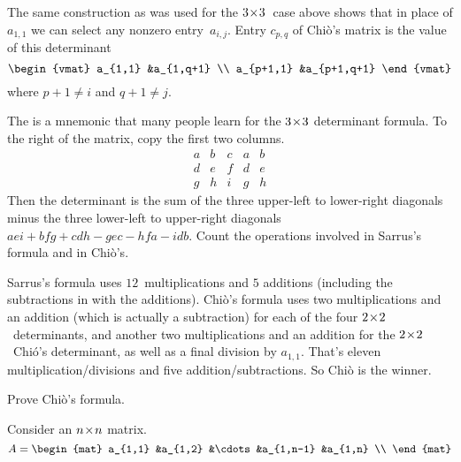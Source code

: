 \begin{exercises}
    \begin{answer}
      The same construction as was used for the $3 \! \times \! 3$~case above shows
      that in place of $a_{1,1}$ we can select any nonzero entry~$a_{i,j}$.
      Entry $c_{p,q}$ of Chi\`o's matrix is the value of this determinant
      \begin{equation*}
        \begin{vmat}
          a_{1,1}    &a_{1,q+1} \\
          a_{p+1,1}  &a_{p+1,q+1}
        \end{vmat}
      \end{equation*}
      where $p+1\neq i$ and $q+1\neq j$.
    \end{answer}
  \item The 
    is a mnemonic that many people learn 
    for the $3 \! \times \! 3$ determinant formula.
    To the right of the matrix, copy the first two columns. 
    \begin{equation*}
      \begin{array}{ccc|cc}
        a &b &c &a &b \\
        d &e &f &d &e \\
        g &h &i &g &h
      \end{array}
    \end{equation*}
    Then the determinant is the sum of the
    three upper-left to lower-right diagonals minus the
    three lower-left to upper-right diagonals
    $aei+bfg+cdh-gec-hfa-idb$.
   Count the operations involved in Sarrus's formula and in
   Chi\`o's.
   \begin{answer}
     Sarrus's formula uses $12$~multiplications and $5$ additions (including
     the subtractions in with the additions).
     Chi\`o's formula uses two multiplications and an addition
     (which is actually a subtraction)
     for each of the four $2 \! \times \! 2$~determinants, and another two
     multiplications and an addition for the $2 \! \times \! 2$~Chi\'o's determinant, as
     well as a final division by $a_{1,1}$.
     That's eleven multiplication/divisions and five addition/subtractions.
     So Chi\`o is the winner.
   \end{answer}
  \item Prove Chi\`o's formula.
    \begin{answer}
      Consider an $n \! \times \! n$ matrix.
      \begin{equation*}
        A=
        \begin{mat}
           a_{1,1}  &a_{1,2}   &\cdots &a_{1,n-1}  &a_{1,n} \\

\end{mat}
\end{equation*}
\end{answer}
\end{exercises}
